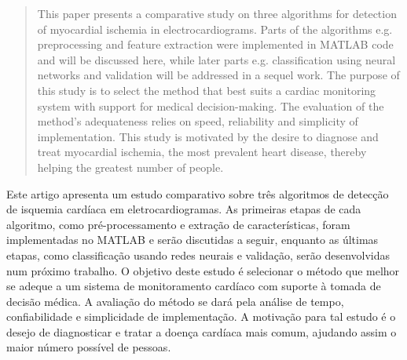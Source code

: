
\begin{abstract}
    This paper presents a comparative study on three algorithms for detection of myocardial ischemia in electrocardiograms. Parts of the algorithms e.g. preprocessing and feature extraction were implemented in MATLAB code and will be discussed here, while later parts e.g. classification using neural networks and validation will be addressed in a sequel work. The purpose of this study is to select the method that best suits a cardiac monitoring system with support for medical decision-making. The evaluation of the method's adequateness relies on speed, reliability and simplicity of implementation. This study is motivated by the desire to diagnose and treat myocardial ischemia, the most prevalent heart disease, thereby helping the greatest number of people.
\end{abstract}

\begin{resumo}
    Este artigo apresenta um estudo comparativo sobre três algoritmos de detecção de isquemia cardíaca em eletrocardiogramas. As primeiras etapas de cada algoritmo, como pré-processamento e extração de características, foram implementadas no MATLAB e serão discutidas a seguir, enquanto as últimas etapas, como classificação usando redes neurais e validação, serão desenvolvidas num próximo trabalho. O objetivo deste estudo é selecionar o método que melhor se adeque a um sistema de monitoramento cardíaco com suporte à tomada de decisão médica. A avaliação do método se dará pela análise de tempo, confiabilidade e simplicidade de implementação. A motivação para tal estudo é o desejo de diagnosticar e tratar a doença cardíaca mais comum, ajudando assim o maior número possível de pessoas.
\end{resumo}

